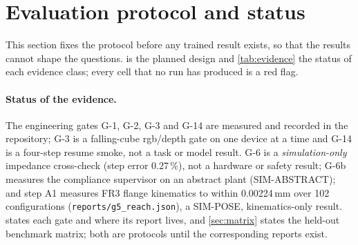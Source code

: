 \section{Evaluation protocol and status}\label{sec:experiments}

This section fixes the protocol before any trained result exists, so that the results cannot shape the questions.
 is the planned design and \cref{tab:evidence} the status of each evidence class; every cell that no run has produced is a red flag.

\paragraph{Status of the evidence.}
The engineering gates G-1, G-2, G-3 and G-14 are measured and recorded in the repository; G-3 is a falling-cube rgb/depth gate on one device at a time and G-14 is a four-step resume smoke, not a task or model result. G-6 is a \emph{simulation-only} impedance cross-check (step error 0.27\,\%), not a hardware or safety result; G-6b measures the compliance supervisor on an abstract plant (SIM-ABSTRACT); and step A1 measures FR3 flange kinematics to within 0.00224\,mm over 102 configurations (\texttt{reports/g5\_reach.json}), a SIM-POSE, kinematics-only result.
 states each gate and where its report lives, and \cref{sec:matrix} states the held-out benchmark matrix; both are protocols until the corresponding reports exist.

